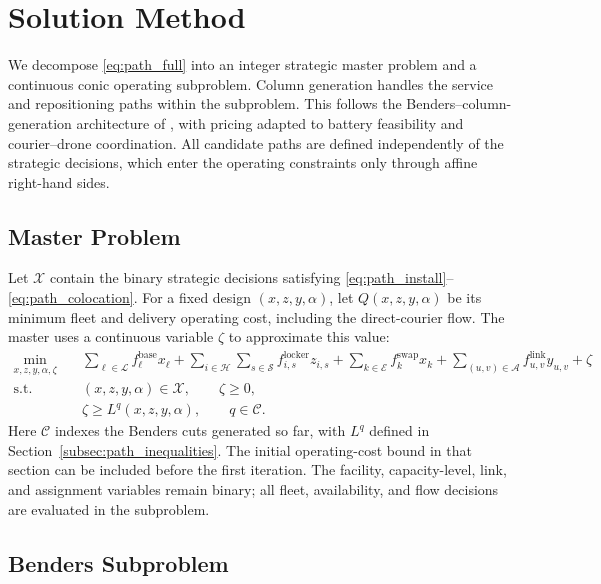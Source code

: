 \documentclass[final,3p,authoryear]{elsarticle}
\begin{document}
\section{Solution Method}
\label{sec:path_solution}

We decompose \eqref{eq:path_full} into an integer strategic master problem and a continuous conic operating subproblem.
Column generation handles the service and repositioning paths within the subproblem.
This follows the Benders--column-generation architecture of \citet{bayramHubNetwork2023TransportationScience}, with pricing adapted to battery feasibility and courier--drone coordination.
All candidate paths are defined independently of the strategic decisions, which enter the operating constraints only through affine right-hand sides.

\subsection{Master Problem}
\label{subsec:path_master}

Let $\mathcal X$ contain the binary strategic decisions satisfying \eqref{eq:path_install}--\eqref{eq:path_colocation}.
For a fixed design $(x,z,y,\alpha)$, let $Q(x,z,y,\alpha)$ be its minimum fleet and delivery operating cost, including the direct-courier flow.
The master uses a continuous variable $\zeta$ to approximate this value:
\begin{equation}
\begin{aligned}
 \min_{x,z,y,\alpha,\zeta}\quad
 &\sum_{\ell\in\mathcal L}f_\ell^{\mathrm{base}}x_\ell
 +\sum_{i\in\mathcal H}\sum_{s\in\mathcal S}f_{i,s}^{\mathrm{locker}}z_{i,s}
 +\sum_{k\in\mathcal E}f_k^{\mathrm{swap}}x_k
 +\sum_{(u,v)\in\mathcal A}f_{u,v}^{\mathrm{link}}y_{u,v}
 +\zeta\\
 \text{s.t.}\quad
 &(x,z,y,\alpha)\in\mathcal X,\qquad \zeta\ge0,\\
 &\zeta\ge L^q(x,z,y,\alpha),\qquad q\in\mathcal C.
\end{aligned}
\label{eq:path_master}
\end{equation}
Here $\mathcal C$ indexes the Benders cuts generated so far, with $L^q$ defined in Section~\ref{subsec:path_inequalities}.
The initial operating-cost bound in that section can be included before the first iteration.
The facility, capacity-level, link, and assignment variables remain binary; all fleet, availability, and flow decisions are evaluated in the subproblem.

\subsection{Benders Subproblem}
\label{subsec:path_subproblem}
\end{document}
